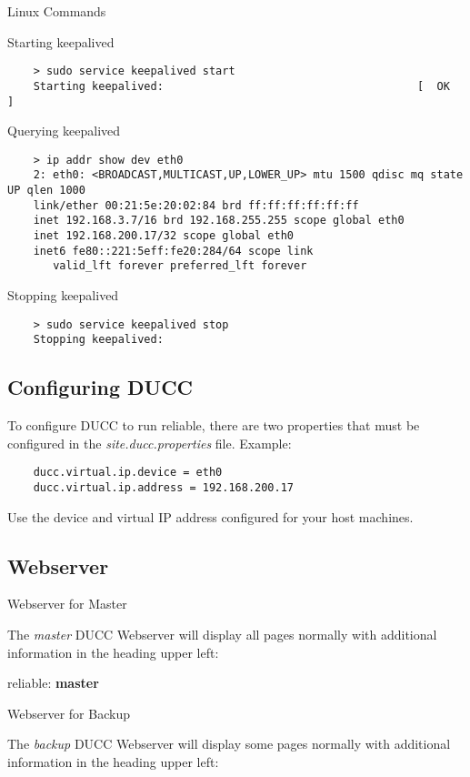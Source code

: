 \documentclass[letterpaper]{article}
\begin{document}
	Linux Commands
	
	Starting keepalived
	
    \begin{verbatim}
    > sudo service keepalived start
    Starting keepalived:                                       [  OK  ]
   	\end{verbatim}
   	
   	Querying keepalived
	
    \begin{verbatim}
    > ip addr show dev eth0
    2: eth0: <BROADCAST,MULTICAST,UP,LOWER_UP> mtu 1500 qdisc mq state UP qlen 1000
    link/ether 00:21:5e:20:02:84 brd ff:ff:ff:ff:ff:ff
    inet 192.168.3.7/16 brd 192.168.255.255 scope global eth0
    inet 192.168.200.17/32 scope global eth0
    inet6 fe80::221:5eff:fe20:284/64 scope link 
       valid_lft forever preferred_lft forever
   	\end{verbatim}

	Stopping keepalived
	
    \begin{verbatim}
    > sudo service keepalived stop
    Stopping keepalived: 
   	\end{verbatim}

\subsection{Configuring DUCC}  
    To configure DUCC to run reliable, there are two properties that must
    be configured in the {\em site.ducc.properties} file.  Example:
    
    \begin{verbatim}
	ducc.virtual.ip.device = eth0
	ducc.virtual.ip.address = 192.168.200.17
   	\end{verbatim}
    
    Use the device and virtual IP address configured for your host machines. 
    
\subsection{Webserver}

	Webserver for Master

	The {\em master} DUCC Webserver will display all pages normally with additional
	information in the heading upper left:
	
	reliable: \textbf{master}
	
	Webserver for Backup
	
	The {\em backup} DUCC Webserver will display some pages normally with additional
	information in the heading upper left:
	
\end{document}
